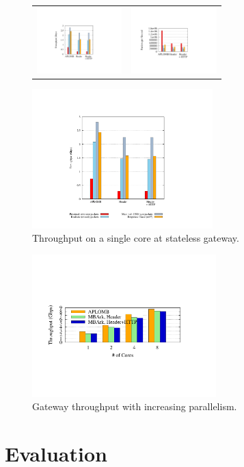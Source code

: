 \begin{figure}[t]
  \centering
  \begin{tabular}{cc}
  \includegraphics[height=1in]{fig/gatewayxput}&
  \includegraphics[height=1in]{fig/gateway_pps}\\
  \end{tabular}
  \includegraphics[width=2.75in]{fig/key}
  \caption[]{\label{fig:gwxput} Throughput on a single core at stateless gateway.}
\end{figure}

\begin{figure}[t]
  \centering
  \includegraphics[width=2.8in]{fig/gateway_scale}
  \caption[]{\label{fig:gwscale} Gateway throughput with increasing parallelism.}
\end{figure}
 
\section{Evaluation} \label{sec:eval}

